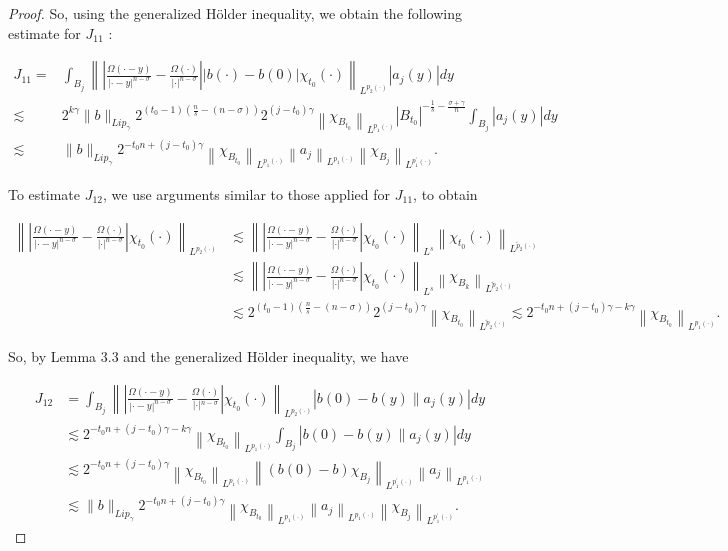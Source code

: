 \documentclass[oneside,reqno]{amsart}
\numberwithin{equation}{section}
\theoremstyle{definition}
\begin{document}
\begin{proof}
So, using the generalized Hölder inequality, we obtain the following estimate for $J_{11}$ :


\begin{align*}
J_{11}=&\int_{B_{j}}\left\|\left|\frac{\Omega(\cdot-y)}{|\cdot-y|^{n-\sigma}}-\frac{\Omega(\cdot)}{|\cdot|^{n-\sigma}}\right|\left|b(\cdot)-b(0)\right| \chi_{t_0}(\cdot)\right\|_{L^{p_{2}(\cdot)}}\left|a_{j}(y)\right| d y \\
\lesssim & 2^{k\gamma}\|b\|_{Lip_\gamma} 2^{(t_0-1)\left(\frac{n}{s}-(n-\sigma)\right)} 2^{(j-t_0) \gamma}\left\|\chi_{B_{t_0}}\right\|_{L^{p_{1}(\cdot)}}\left|B_{t_0}\right|^{-\frac{1}{s}-\frac{\sigma+\gamma}{n}} \int_{B_{j}}\left|a_{j}(y)\right| d y  \\
\lesssim &\|b\|_{Lip_\gamma} 2^{-t_0n+(j-t_0) \gamma}\left\|\chi_{B_{t_0}}\right\|_{L^{p_{1}(\cdot)}}\left\|a_{j}\right\|_{L^{p_{1}(\cdot)}}\left\|\chi_{B_{j}}\right\|_{L^{p_{1}^{\prime}(\cdot)}}.
\end{align*}


To estimate $J_{12}$, we use arguments similar to those applied for $J_{11}$, to obtain

$$
\begin{aligned}
 \left\|\left|\frac{\Omega(\cdot-y)}{|\cdot-y|^{n-\sigma}}-\frac{\Omega(\cdot)}{|\cdot|^{n-\sigma}}\right| \chi_{t_0}(\cdot)\right\|_{L^{p_{2}(\cdot)}} &\lesssim\left\|\left|\frac{\Omega(\cdot-y)}{|\cdot-y|^{n-\sigma}}-\frac{\Omega(\cdot)}{|\cdot|^{n-\sigma}}\right| \chi_{t_0}(\cdot)\right\|_{L^{s}} \left\|\chi_{t_0}(\cdot) \right\|_{L^{\tilde{p}_{2}(\cdot)}} \\
& \lesssim\left\|\left|\frac{\Omega(\cdot-y)}{|\cdot-y|^{n-\sigma}}-\frac{\Omega(\cdot)}{|\cdot|^{n-\sigma}}\right| \chi_{t_0}(\cdot)\right\|_{L^{s}} \left\|\chi_{B_k} \right\|_{L^{\tilde{p}_{2}(\cdot)}} \\
& \lesssim  2^{(t_0-1)\left(\frac{n}{s}-(n-\sigma)\right)} 2^{(j-t_0) \gamma}\left\|\chi_{B_{t_0}}\right\|_{L^{\tilde{p}_{2}(\cdot)}} \lesssim  2^{-t_0n+(j-t_0) \gamma-k\gamma}\left\|\chi_{B_{t_0}}\right\|_{L^{p_{1}(\cdot)}}.
\end{aligned}
$$

So, by Lemma $3.3$ and the generalized Hölder inequality, we have


\begin{align*}
J_{12}&=  \int_{B_{j}}\left\|\left|\frac{\Omega(\cdot-y)}{|\cdot-y|^{n-\sigma}}-\frac{\Omega(\cdot)}{|\cdot|{ }^{n-\sigma}}\right| \chi_{t_0}(\cdot)\right\|_{L^{p_{2}(\cdot)}}\left|b(0)-b(y) \| a_{j}(y)\right| d y \\
& \lesssim  2^{-t_0n+(j-t_0) \gamma-k\gamma}\left\|\chi_{B_{t_0}}\right\|_{L^{p_{1}(\cdot)}} \int_{B_{j}}\left|b(0)-b(y) \| a_{j}(y)\right| d y \\
&\lesssim   2^{-t_0n+(j-t_0) \gamma}\left\|\chi_{B_{t_0}}\right\|_{L^{p_{1}(\cdot)}}\left\|\left(b(0)-b\right) \chi_{B_{j}}\right\|_{L^{p_{1}^{\prime}(\cdot)}}\left\|a_{j}\right\|_{L^{p_{1}(\cdot)}} \\
&\lesssim  \|b\|_{Lip_\gamma} 2^{-t_0n+(j-t_0) \gamma}\left\|\chi_{B_{t_0}}\right\|_{L^{p_{1}(\cdot)}}\left\|a_{j}\right\|_{L^{p_{1}(\cdot)}}\left\|\chi_{B_{j}}\right\|_{L^{p_{1}^{\prime}(\cdot)}}.
\end{align*}



\end{proof}
\end{document}
